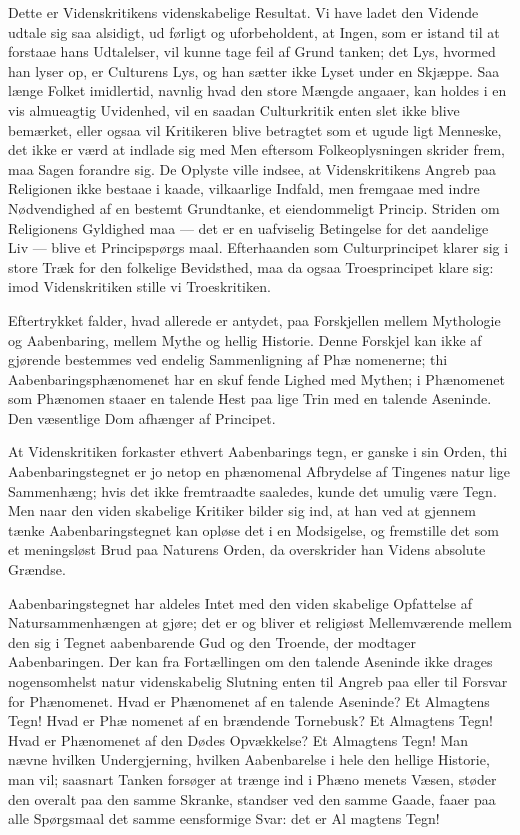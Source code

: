\documentclass[12pt]{book}
\newcommand{\opage}[1]{\marginnote{\footnotesize\textit{[#1]}}}
\begin{document}
Dette er Videnskritikens videnskabelige Resultat.
Vi have ladet den Vidende udtale sig saa alsidigt, ud\-%
førligt og uforbeholdent, at Ingen, som er istand til at
forstaae hans Udtalelser, vil kunne tage feil af Grund\-%
tanken; det Lys, hvormed han lyser op, er Culturens
Lys, og han sætter ikke Lyset under en Skjæppe. Saa\-%
længe Folket imidlertid, navnlig hvad den store Mængde
angaaer, kan holdes i en vis almueagtig Uvidenhed, vil
en saadan Culturkritik enten slet ikke blive bemærket,
eller ogsaa vil Kritikeren blive betragtet som et ugude\-%
ligt Menneske, det ikke er værd at indlade sig med
Men eftersom Folkeoplysningen skrider frem, maa Sagen
forandre sig. De Oplyste ville indsee, at Videnskritikens
Angreb paa Religionen ikke bestaae i kaade, vilkaarlige
\opage{166}\setcounter{footnote}{0}%
Indfald, men fremgaae med indre Nødvendighed af en
bestemt Grundtanke, et eiendommeligt Princip. Striden
om Religionens Gyldighed maa --- det er en uafviselig
Betingelse for det aandelige Liv --- blive et Principspørgs\-%
maal. Efterhaanden som Culturprincipet klarer sig i
store Træk for den folkelige Bevidsthed, maa da ogsaa
Troesprincipet klare sig: imod Videnskritiken stille vi
Troeskritiken.

Eftertrykket falder, hvad allerede er antydet, paa
Forskjellen mellem Mythologie og Aabenbaring, mellem
Mythe og hellig Historie. Denne Forskjel kan ikke af\-%
gjørende bestemmes ved endelig Sammenligning af Phæ\-%
nomenerne; thi Aabenbaringsphænomenet har en skuf\-%
fende Lighed med Mythen; i Phænomenet som Phænomen
staaer en talende Hest paa lige Trin med en talende
Aseninde. Den væsentlige Dom afhænger af Principet.

At Videnskritiken forkaster ethvert Aabenbarings\-%
tegn, er ganske i sin Orden, thi Aabenbaringstegnet er
jo netop en phænomenal Afbrydelse af Tingenes natur\-%
lige Sammenhæng; hvis det ikke fremtraadte saaledes,
kunde det umulig være Tegn. Men naar den viden\-%
skabelige Kritiker bilder sig ind, at han ved at gjennem\-%
tænke Aabenbaringstegnet kan opløse det i en Modsigelse,
og fremstille det som et meningsløst Brud paa Naturens
Orden, da overskrider han Videns absolute Grændse.

Aabenbaringstegnet har aldeles Intet med den viden\-%
skabelige Opfattelse af Natursammenhængen at gjøre;
det er og bliver et religiøst Mellemværende mellem den
sig i Tegnet aabenbarende Gud og den Troende, der
modtager Aabenbaringen. Der kan fra Fortællingen om
den talende Aseninde ikke drages nogensomhelst natur\-%
videnskabelig Slutning enten til Angreb paa eller til
Forsvar for Phænomenet. Hvad er Phænomenet af en
talende Aseninde? Et Almagtens Tegn! Hvad er Phæ\-%
\opage{167}\setcounter{footnote}{0}%
nomenet af en brændende Tornebusk? Et Almagtens
Tegn! Hvad er Phænomenet af den Dødes Opvækkelse?
Et Almagtens Tegn! Man nævne hvilken Undergjerning,
hvilken Aabenbarelse i hele den hellige Historie, man
vil; saasnart Tanken forsøger at trænge ind i Phæno\-%
menets Væsen, støder den overalt paa den samme
Skranke, standser ved den samme Gaade, faaer paa alle
Spørgsmaal det samme eensformige Svar: det er Al\-%
magtens Tegn!
\end{document}
